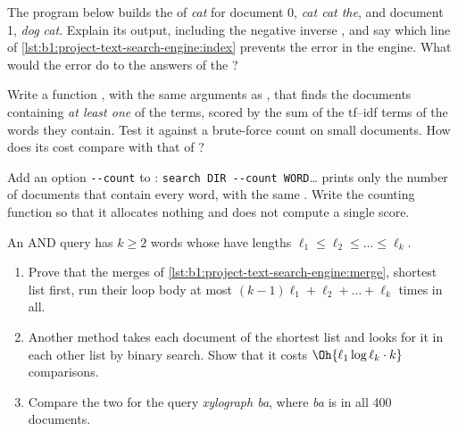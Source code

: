 \begin{exercise}[$\star\star$]\label{exo:b1:project-text-search-engine:6}
The program below builds the  of \emph{cat} for document 0, \emph{cat cat the}, and document 1, \emph{dog
cat}. Explain its output, including the negative inverse , and say which line of
\cref{lst:b1:project-text-search-engine:index} prevents the error in the engine. What would the error do to the
answers of the ?

\end{exercise}

\begin{exercise}[$\star\star$]\label{exo:b1:project-text-search-engine:7}
Write a function , with the same arguments as , that finds the documents containing
\emph{at least one} of the terms, scored by the sum of the tf--idf terms of the words they contain. Test it against a
brute-force count on small documents. How does its cost compare with that of ?
\end{exercise}

\begin{exercise}[$\star\star$]\label{exo:b1:project-text-search-engine:8}
Add an option \texttt{-{}-{}count} to : \texttt{search DIR -{}-{}count WORD}\dots{} prints only the number of documents
that contain every word, with the same . Write the counting function so that it allocates nothing and does
not compute a single score.
\end{exercise}

\begin{exercise}[$\star\star$]\label{exo:b1:project-text-search-engine:9}
An AND query has $k \ge 2$ words whose  have lengths $\ell_1 \le \ell_2 \le \dots \le \ell_k$.
\begin{enumerate}
\item Prove that the merges of \cref{lst:b1:project-text-search-engine:merge}, shortest list first, run their loop body
at most $(k - 1)\ell_1 + \ell_2 + \dots + \ell_k$ times in all.
\item Another method takes each document of the shortest list and looks for it in each other list by binary search.
Show that it costs $\Oh{\ell_1 \log \ell_k \cdot k}$ comparisons.
\item Compare the two for the query \emph{xylograph ba}, where \emph{ba} is in all 400 documents.
\end{enumerate}
\end{exercise}


